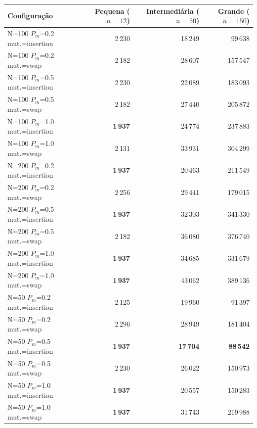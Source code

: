 \begin{tabular}{lrrr}
\toprule
Configuração & Pequena ($n=12$) & Intermediária ($n=50$) & Grande ($n=150$) \\
\midrule
N=100 $P_m$=0.2 mut.=insertion & 2\,230 & 18\,249 & 99\,638 \\
N=100 $P_m$=0.2 mut.=swap & 2\,182 & 28\,607 & 157\,547 \\
N=100 $P_m$=0.5 mut.=insertion & 2\,230 & 22\,089 & 183\,093 \\
N=100 $P_m$=0.5 mut.=swap & 2\,182 & 27\,440 & 205\,872 \\
N=100 $P_m$=1.0 mut.=insertion & \textbf{1\,937} & 24\,774 & 237\,883 \\
N=100 $P_m$=1.0 mut.=swap & 2\,131 & 33\,931 & 304\,299 \\
N=200 $P_m$=0.2 mut.=insertion & \textbf{1\,937} & 20\,463 & 211\,549 \\
N=200 $P_m$=0.2 mut.=swap & 2\,256 & 29\,441 & 179\,015 \\
N=200 $P_m$=0.5 mut.=insertion & \textbf{1\,937} & 32\,303 & 341\,330 \\
N=200 $P_m$=0.5 mut.=swap & 2\,182 & 36\,080 & 376\,740 \\
N=200 $P_m$=1.0 mut.=insertion & \textbf{1\,937} & 34\,685 & 331\,679 \\
N=200 $P_m$=1.0 mut.=swap & \textbf{1\,937} & 43\,062 & 389\,136 \\
N=50 $P_m$=0.2 mut.=insertion & 2\,125 & 19\,960 & 91\,397 \\
N=50 $P_m$=0.2 mut.=swap & 2\,296 & 28\,949 & 181\,404 \\
N=50 $P_m$=0.5 mut.=insertion & \textbf{1\,937} & \textbf{17\,704} & \textbf{88\,542} \\
N=50 $P_m$=0.5 mut.=swap & 2\,230 & 26\,022 & 150\,973 \\
N=50 $P_m$=1.0 mut.=insertion & \textbf{1\,937} & 20\,557 & 150\,283 \\
N=50 $P_m$=1.0 mut.=swap & \textbf{1\,937} & 31\,743 & 219\,988 \\
\bottomrule
\end{tabular}
